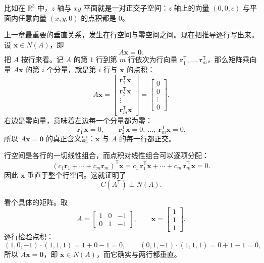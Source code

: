 \documentclass[UTF8,a4paper,12pt]{ctexart}
\numberwithin{equation}{section}
\newcommand{\R}{\mathbb{R}}
\newcommand{\trans}{^{\mathsf T}}
\begin{document}
	比如在 $\R^3$ 中，$z$ 轴与 $xy$ 平面就是一对正交子空间：$z$ 轴上的向量 $(0,0,c)$ 与平面内任意向量 $(x,y,0)$ 的点积都是 $0$。

	上一章最重要的垂直关系，发生在行空间与零空间之间。现在把推导逐行写出来。设 $\bm{x}\in N(A)$，即
	\begin{equation}\label{eq:6.3}
	A\bm{x}=\bm{0}.
	\end{equation}
	把 $A$ 按行来看。记 $A$ 的第 $1$ 行到第 $m$ 行依次为行向量 $\bm{r}_1\trans,\ldots,\bm{r}_m\trans$，那么矩阵乘向量 $A\bm{x}$ 的第 $i$ 个分量，就是第 $i$ 行与 $\bm{x}$ 的点积：
	\begin{equation}\label{eq:6.4}
	A\bm{x}
	=
	\begin{bmatrix}
		\bm{r}_1\trans\bm{x}\\
		\bm{r}_2\trans\bm{x}\\
		\vdots\\
		\bm{r}_m\trans\bm{x}
	\end{bmatrix}
	=
	\begin{bmatrix}
		0\\
		0\\
		\vdots\\
		0
	\end{bmatrix}.
	\end{equation}
	右边是零向量，意味着左边每一个分量都为零：
	\begin{equation}\label{eq:6.5}
	\bm{r}_1\trans\bm{x}=0,
	\qquad
	\bm{r}_2\trans\bm{x}=0,
	\ \ldots,\ 
	\bm{r}_m\trans\bm{x}=0.
	\end{equation}
	所以 $A\bm{x}=\bm{0}$ 的真正含义是：$\bm{x}$ 与 $A$ 的每一行都正交。

	行空间是各行的一切线性组合，而点积对线性组合可以逐项分配：
	\begin{equation}\label{eq:6.6}
	(c_1\bm{r}_1+\cdots+c_m\bm{r}_m)\trans\bm{x}
	=c_1\,\bm{r}_1\trans\bm{x}+\cdots+c_m\,\bm{r}_m\trans\bm{x}
	=0.
	\end{equation}
	因此 $\bm{x}$ 垂直于整个行空间。这就证明了
	\begin{equation}\label{eq:6.7}
	\boxed{C(A\trans)\perp N(A).}
	\end{equation}

	看个具体的矩阵。取
	\begin{equation}\label{eq:6.8}
	A=
	\begin{bmatrix}
		1&0&-1\\
		0&1&-1
	\end{bmatrix},
	\qquad
	\bm{x}=
	\begin{bmatrix}
		1\\
		1\\
		1
	\end{bmatrix}.
	\end{equation}
	逐行检验点积：
	\begin{equation}\label{eq:6.9}
	(1,0,-1)\cdot(1,1,1)=1+0-1=0,
	\qquad
	(0,1,-1)\cdot(1,1,1)=0+1-1=0,
	\end{equation}
	所以 $A\bm{x}=\bm{0}$，即 $\bm{x}\in N(A)$，而它确实与两行都垂直。
\end{document}
